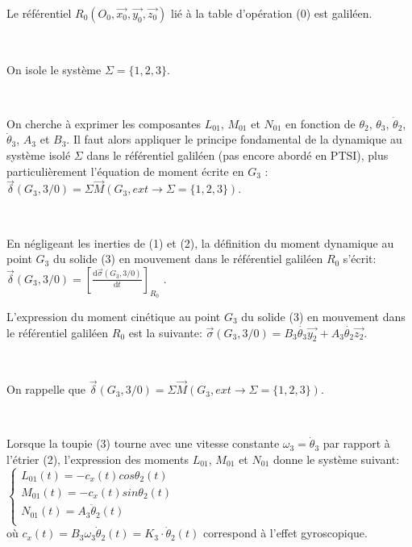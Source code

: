 Le référentiel $R_0(O_0,\overrightarrow{x_0},\overrightarrow{y_0},\overrightarrow{z_0})$ lié à la table d'opération (0) est galiléen.


~\

On isole le système $\Sigma=\{1,2,3 \}$.


~\

On cherche à exprimer les composantes $L_{01}$,  $M_{01}$ et  $N_{01}$ en fonction de $\theta_2$, $\theta_3$, $\dot{\theta}_2$, $\dot{\theta}_3$, $A_3$ et $B_3$. Il faut alors appliquer le principe fondamental de la dynamique au système isolé $\Sigma$ dans le référentiel galiléen (pas encore abordé en PTSI), plus particulièrement l'équation de moment écrite en $G_3$ :
$\overrightarrow{\delta}(G_3,3/0)=\Sigma\overrightarrow{M}(G_3, ext\rightarrow\Sigma=\{ 1,2,3 \})$.


~\

En négligeant les inerties de (1) et (2), la définition du moment dynamique au point $G_3$ du solide (3) en mouvement dans le référentiel galiléen $R_0$ s'écrit: $\overrightarrow{\delta}(G_3,3/0)=\left [ \frac{ \mathrm{d} \overrightarrow{\sigma}(G_3,3/0)}{ \mathrm{d} t} \right]_{R_0}$ .

L'expression du moment cinétique au point $G_3$ du solide (3) en mouvement dans le référentiel galiléen $R_0$ est la suivante:
$\overrightarrow{\sigma}(G_3,3/0)=B_3 \dot{\theta_3}\overrightarrow{y_2}+A_3\dot{\theta_2}\overrightarrow{z_2}$.


~\

On rappelle que $\overrightarrow{\delta}(G_3,3/0)=\Sigma\overrightarrow{M}(G_3, ext\rightarrow\Sigma=\{ 1,2,3 \})$.


~\

Lorsque la toupie (3) tourne avec une  vitesse constante $\omega_3=\dot{\theta}_3$ par rapport à l'étrier (2), l'expression des moments $L_{01}$, $M_{01}$ et $N_{01}$ donne le système suivant:
$\begin{cases}
 L_{01}(t)=-c_x(t)cos\theta_2(t) \\ 
 M_{01}(t)=-c_x(t)sin\theta_2(t) \\ 
 N_{01}(t)=A_3\ddot\theta_2(t) \\ 
\end{cases}$
\\ où $c_x(t)=B_3\omega_3\dot\theta_2(t)=K_3 \cdot \dot\theta_2(t)$ correspond à l'effet gyroscopique.

